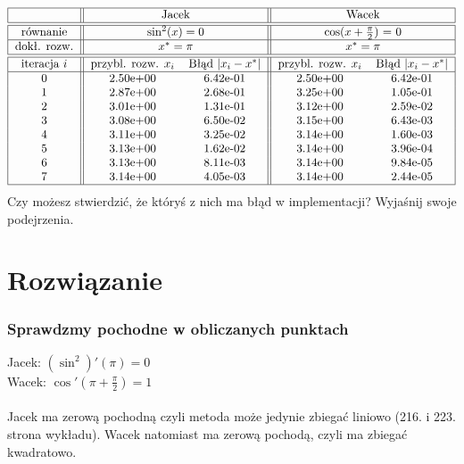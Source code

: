 \documentclass[a4paper]{article}
\begin{document}
   \[
      \begin{tabular}{ | c || c c || c c | }
         \hline
         &
         \multicolumn{2}{ c || }{Jacek} &
         \multicolumn{2}{ c | }{Wacek} \\
         \hline \hline
         równanie &
         \multicolumn{2}{ c || }{$\sin^{2}(x) = 0$} &
         \multicolumn{2}{ c | }{$\cos(x + \frac{\pi}{2})$ = 0} \\
         \hline
         dokł. rozw. &
         \multicolumn{2}{ c || }{$x^{*} = \pi$} &
         \multicolumn{2}{ c | }{$x^{*} = \pi$} \\
         \hline \hline
         iteracja $i$ &
         przybl. rozw. $x_{i}$ & Błąd $|x_{i} - x^{*}|$ &
         przybl. rozw. $x_{i}$ & Błąd $|x_{i} - x^{*}|$ \\
         \hline
         0 & 2.50e+00 & 6.42e-01 & 2.50e+00 & 6.42e-01 \\
         1 & 2.87e+00 & 2.68e-01 & 3.25e+00 & 1.05e-01 \\
         2 & 3.01e+00 & 1.31e-01 & 3.12e+00 & 2.59e-02 \\
         3 & 3.08e+00 & 6.50e-02 & 3.15e+00 & 6.43e-03 \\
         4 & 3.11e+00 & 3.25e-02 & 3.14e+00 & 1.60e-03 \\
         5 & 3.13e+00 & 1.62e-02 & 3.14e+00 & 3.96e-04 \\
         6 & 3.13e+00 & 8.11e-03 & 3.14e+00 & 9.84e-05 \\
         7 & 3.14e+00 & 4.05e-03 & 3.14e+00 & 2.44e-05 \\
         \hline
      \end{tabular}
   \]
   Czy możesz stwierdzić, że któryś z nich ma błąd w implementacji?
   Wyjaśnij swoje podejrzenia.

   \section*{\large Rozwiązanie}

   \subsubsection*{Sprawdzmy pochodne w obliczanych punktach}
   Jacek: $\left( \sin^{2} \right)'(\pi) = 0$ \\
   Wacek: $\cos'(\pi + \frac{\pi}{2}) = 1$ \\
   \\
   Jacek ma zerową pochodną czyli metoda może jedynie zbiegać liniowo (216. i 223. strona wykładu).
   Wacek natomiast ma zerową pochodą, czyli ma zbiegać kwadratowo.
\end{document}
